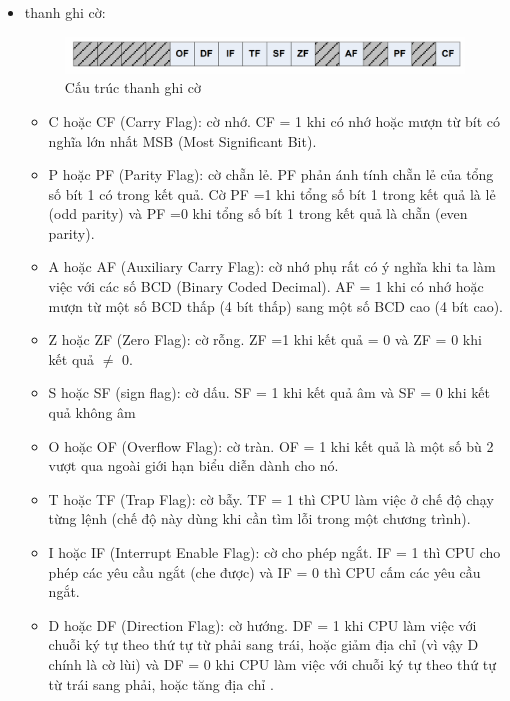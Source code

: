 \documentclass[../report.tex]{subfiles}
\begin{document}
\begin{itemize}
    \item thanh ghi cờ:
    \begin{figure}[H]
        \centering
        \includegraphics[width=\textwidth]{figures/flag.png}
        \caption{Cấu trúc thanh ghi cờ}
    \end{figure}
        \begin{itemize}
            \item C hoặc CF (Carry Flag): cờ nhớ. CF = 1 khi có nhớ hoặc mượn từ bít có nghĩa lớn
nhất MSB (Most Significant Bit). 
            \item P hoặc PF (Parity Flag): cờ chẵn lẻ. PF phản ánh tính chẵn lẻ của tổng số bít 1 có
trong kết quả. Cờ PF =1 khi tổng số bít 1 trong kết quả là lẻ (odd parity) và PF =0 khi
tổng số bít 1 trong kết quả là chẵn (even parity). 
            \item A hoặc AF (Auxiliary Carry Flag): cờ nhớ phụ rất có ý nghĩa khi ta làm việc với các
số BCD (Binary Coded Decimal). AF = 1 khi có nhớ hoặc mượn từ một số BCD thấp
(4 bít thấp) sang một số BCD cao (4 bít cao). 
            \item Z hoặc ZF (Zero Flag): cờ rỗng. ZF =1 khi kết quả = 0 và ZF = 0 khi kết quả $\neq$ 0.         
            \item S hoặc SF (sign flag): cờ dấu. SF = 1 khi kết quả âm và SF = 0 khi kết quả không âm
            \item O hoặc OF (Overflow Flag): cờ tràn. OF = 1 khi kết quả là một số bù 2 vượt qua ngoài
giới hạn biểu diễn dành cho nó. 
            \item T hoặc TF (Trap Flag): cờ bẫy. TF = 1 thì CPU làm việc ở chế độ chạy từng lệnh (chế
độ này dùng khi cần tìm lỗi trong một chương trình). 
            \item I hoặc IF (Interrupt Enable Flag): cờ cho phép ngắt. IF = 1 thì CPU cho phép các yêu
cầu ngắt (che được) và IF = 0 thì CPU cấm các yêu cầu ngắt. 
            \item D hoặc DF (Direction Flag): cờ hướng. DF = 1 khi CPU làm việc với chuỗi ký tự theo
thứ tự từ phải sang trái, hoặc giảm địa chỉ (vì vậy D chính là cờ lùi) và DF = 0 khi
CPU làm việc với chuỗi ký tự theo thứ tự từ trái sang phải, hoặc tăng địa chỉ .
        \end{itemize}

\end{itemize}
\end{document}
